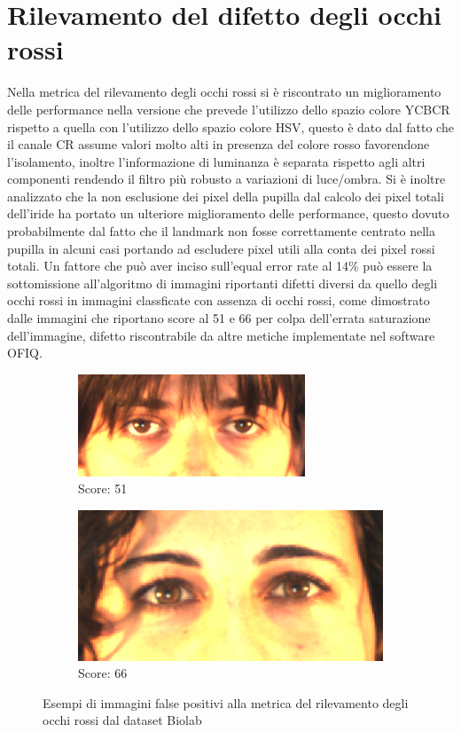 \documentclass[12pt,a4paper,openright,twoside]{book}
\begin{document}
\section{Rilevamento del difetto degli occhi rossi}
Nella metrica del rilevamento degli occhi rossi si è riscontrato un miglioramento delle performance nella versione che prevede l'utilizzo dello spazio colore YCBCR rispetto a quella con l'utilizzo dello spazio colore HSV, questo è dato dal fatto che il canale CR assume valori molto alti in presenza del colore rosso favorendone l'isolamento, inoltre l'informazione di luminanza è separata rispetto agli altri componenti rendendo il filtro più robusto a variazioni di luce/ombra. Si è inoltre analizzato che la non esclusione dei pixel della pupilla dal calcolo dei pixel totali dell'iride ha portato un ulteriore miglioramento delle performance, questo dovuto probabilmente dal fatto che il landmark non fosse correttamente centrato nella pupilla in alcuni casi portando ad escludere pixel utili alla conta dei pixel rossi totali. Un fattore che può aver inciso sull'equal error rate al 14\% può essere la sottomissione all'algoritmo di immagini riportanti difetti diversi da quello degli occhi rossi in immagini classficate con assenza di occhi rossi, come dimostrato dalle immagini  che riportano score al 51 e 66 per colpa dell'errata saturazione dell'immagine, difetto riscontrabile da altre metiche implementate nel software OFIQ.
\begin{figure}[htbp]
    \centering
    \begin{subfigure}{0.49\textwidth}
        \centering
        \includegraphics[width=.7\linewidth]{figures/red_eye_false_negative_image_1.png}
        \caption{Score: 51}
    \end{subfigure}
    \hfill
    \begin{subfigure}{0.49\textwidth}
        \centering
        \includegraphics[width=.7\linewidth]{figures/red_eye_false_negative_image_2.png}
        \caption{Score: 66}
    \end{subfigure}
    \label{fig:red_eye_false_negative_images}
    \caption{Esempi di immagini false positivi alla metrica del rilevamento degli occhi rossi dal dataset Biolab}
\end{figure}
\end{document}
